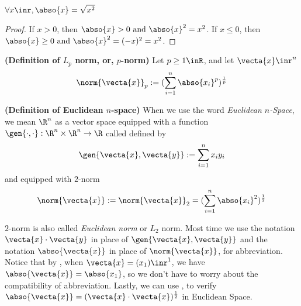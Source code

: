 \documentclass{report}
\begin{document}
\begin{theorem}
\label{1.5.3}
$\forall x\inr,\abso{x}=\sqrt{x^2} $
\end{theorem}
\begin{proof}
If $x>0$, then  $\abso{x}>0\text{ and }\abso{x}^2=x^2$. If $x\leq 0$, then $\abso{x}\geq 0\text{ and }\abso{x}^2=(-x)^2=x^2$. 
\end{proof}
\begin{definition}
\label{1.5.4}
\textbf{(Definition of $L_p$ norm, or, $p$-norm)} Let $p\geq 1\inR$, and let $\vecta{x}\inr^n$
\begin{equation*}
\norm{\vecta{x}}_p:=(\sum_{i=1}^{n}\abso{x_i}^p)^{\frac{1}{p}} 
\end{equation*}
\end{definition}
\begin{definition}
\label{1.5.5}
\textbf{(Definition of Euclidean $n$-space)}
When we use the word \textit{Euclidean $n$-Space}, we mean $\R^n$ as a vector space equipped with a function $\gen{\cdot,\cdot}:\R^n\times\R^n\rightarrow \R$ called  defined by
\begin{equation*}
\gen{\vecta{x},\vecta{y}}:=\sum_{i=1}^{n}x_iy_i
\end{equation*}
and equipped with $2$-norm
\begin{equation*}
\norm{\vecta{x}}:=\norm{\vecta{x}}_2=(\sum_{i=1}^{n}\abso{x_i}^2)^{\frac{1}{2}} 
\end{equation*}

$2$-norm is also called \textit{Euclidean norm}  or  $L_2$ norm. Most time we use the notation $\vecta{x}\cdot\vecta{y}$ in place of $\gen{\vecta{x},\vecta{y}}$  and the notation $\abso{\vecta{x}}$ in place of $\norm{\vecta{x}}$, for abbreviation. Notice that by , when $\vecta{x}=(x_1)\inr^1$, we have $\abso{\vecta{x}}=\abso{x_1}$, so we don't have to worry about the compatibility of abbreviation.  Lastly, we can use , to verify $\abso{\vecta{x}}=(\vecta{x}\cdot\vecta{x})^{\frac{1}{2}}$ in Euclidean Space. 
\end{definition}
\end{document}
